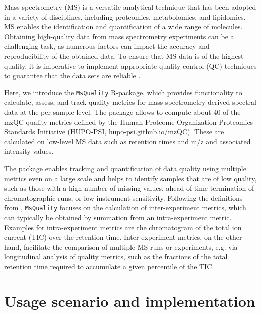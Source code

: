 \documentclass{bioinfo}
\begin{document}

\maketitle

Mass spectrometry (MS) is a versatile analytical technique that has been 
adopted in a variety of disciplines, including proteomics, metabolomics, and 
lipidomics. MS enables the identification and quantification of a wide range 
of molecules. Obtaining high-quality data from mass spectrometry experiments 
can be a challenging task, as numerous factors can impact the accuracy and 
reproducibility of the obtained data. To ensure that MS data is of the 
highest quality, it is imperative to implement appropriate quality control 
(QC) techniques to guarantee that the data sets are reliable 
\citep{Koecher2011}.

Here, we introduce the \texttt{MsQuality} R-package, which provides 
functionality to calculate, assess, and track quality metrics for mass 
spectrometry-derived spectral data at the per-sample level. 
The package allows to compute about 40 of the mzQC quality metrics defined by
the Human Proteome Organization-Proteomics Standards Initiative (HUPO-PSI,
hupo-psi.github.io/mzQC). These are calculated on low-level MS data
such as retention times and m/z and associated intensity values.

The package enables tracking and quantification of data quality using 
multiple metrics even on a large scale and helps to identify samples that 
are of low quality, such as those with a high number of missing values, 
ahead-of-time termination of chromatographic runs, or low instrument sensitivity. 
Following the definitions from \cite{Bittremieux2017}, \texttt{MsQuality}
focuses on the calculation of inter-experiment metrics, which can typically be 
obtained by summation from an intra-experiment metric. Examples for
intra-experiment metrics are the chromatogram of the total ion current (TIC) 
over the retention time. Inter-experiment metrics, on the other hand, 
facilitate the comparison of multiple MS runs or experiments, 
e.g. via longitudinal analysis of quality metrics, such as the
fractions of the total retention time required to accumulate a given
percentile of the TIC.

\section{Usage scenario and implementation} \label{usagescenario}
\end{document}
